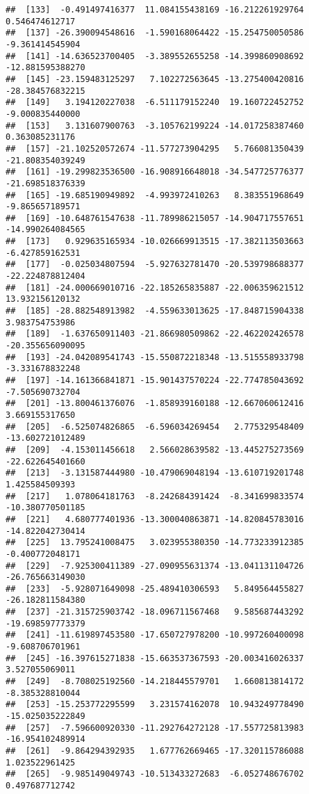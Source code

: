 \documentclass[
]{article}
\begin{document}
\begin{verbatim}
##  [133]  -0.491497416377  11.084155438169 -16.212261929764   0.546474612717
##  [137] -26.390094548616  -1.590168064422 -15.254750050586  -9.361414545904
##  [141] -14.636523700405  -3.389552655258 -14.399860908692 -12.881595388270
##  [145] -23.159483125297   7.102272563645 -13.275400420816 -28.384576832215
##  [149]   3.194120227038  -6.511179152240  19.160722452752  -9.000835440000
##  [153]   3.131607900763  -3.105762199224 -14.017258387460   0.363085231176
##  [157] -21.102520572674 -11.577273904295   5.766081350439 -21.808354039249
##  [161] -19.299823536500 -16.908916648018 -34.547725776377 -21.698518376339
##  [165] -19.685190949892  -4.993972410263   8.383551968649  -9.865657189571
##  [169] -10.648761547638 -11.789986215057 -14.904717557651 -14.990264084565
##  [173]   0.929635165934 -10.026669913515 -17.382113503663  -6.427859162531
##  [177]  -0.025034807594  -5.927632781470 -20.539798688377 -22.224878812404
##  [181] -24.000669010716 -22.185265835887 -22.006359621512  13.932156120132
##  [185] -28.882548913982  -4.559633013625 -17.848715904338   3.983754753986
##  [189]  -1.637650911403 -21.866980509862 -22.462202426578 -20.355656090095
##  [193] -24.042089541743 -15.550872218348 -13.515558933798  -3.331678832248
##  [197] -14.161366841871 -15.901437570224 -22.774785043692  -7.505690732704
##  [201] -13.800461376076  -1.858939160188 -12.667060612416   3.669155317650
##  [205]  -6.525074826865  -6.596034269454   2.775329548409 -13.602721012489
##  [209]  -4.153011456618   2.566028639582 -13.445275273569 -22.622645401660
##  [213]  -3.131587444980 -10.479069048194 -13.610719201748   1.425584509393
##  [217]   1.078064181763  -8.242684391424  -8.341699833574 -10.380770501185
##  [221]   4.680777401936 -13.300040863871 -14.820845783016 -14.822042730414
##  [225]  13.795241008475   3.023955380350 -14.773233912385  -0.400772048171
##  [229]  -7.925300411389 -27.090955631374 -13.041131104726 -26.765663149030
##  [233]  -5.928071649098 -25.489410306593   5.849564455827 -26.182811584380
##  [237] -21.315725903742 -18.096711567468   9.585687443292 -19.698597773379
##  [241] -11.619897453580 -17.650727978200 -10.997260400098  -9.608706701961
##  [245] -16.397615271838 -15.663537367593 -20.003416026337   3.527055069011
##  [249]  -8.708025192560 -14.218445579701   1.660813814172  -8.385328810044
##  [253] -15.253772295599   3.231574162078  10.943249778490 -15.025035222849
##  [257]  -7.596600920330 -11.292764272128 -17.557725813983 -16.954102489914
##  [261]  -9.864294392935   1.677762669465 -17.320115786088   1.023522961425
##  [265]  -9.985149049743 -10.513433272683  -6.052748676702   0.497687712742

\end{verbatim}
\end{document}
